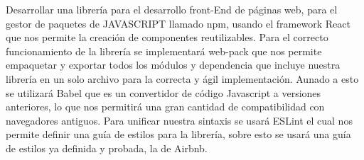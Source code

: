 Desarrollar una librería para el desarrollo front-End de páginas web, para el gestor de paquetes de JAVASCRIPT llamado npm, usando el framework React que nos permite la creación de componentes reutilizables. Para el correcto funcionamiento de la librería se implementará web-pack que nos permite empaquetar y exportar todos los módulos y dependencia que incluye nuestra librería en un solo archivo para la correcta y ágil implementación. Aunado a esto se utilizará Babel que es un convertidor de código Javascript a versiones anteriores, lo que nos permitirá una gran cantidad de compatibilidad con navegadores antiguos. Para unificar nuestra sintaxis se usará ESLint el cual nos permite definir una guía de estilos para la librería, sobre esto se usará una guía de estilos ya definida y probada, la de Airbnb. 
\newpage
